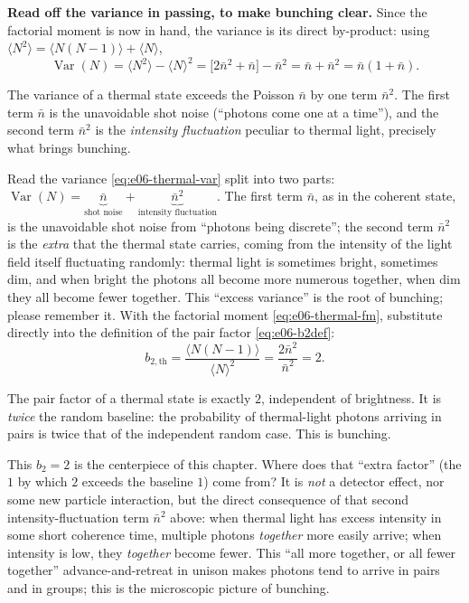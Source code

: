 \textbf{Read off the variance in passing, to make bunching clear.} Since the factorial moment is now in hand, the variance is its direct by-product: using \(\langle N^2\rangle=\langle N(N-1)\rangle+\langle N\rangle\),
\begin{equation}
  \operatorname{Var}(N)=\langle N^{2}\rangle-\langle N\rangle^{2}
  =\big[2\bar n^{2}+\bar n\big]-\bar n^{2}
  =\bar n+\bar n^{2}=\bar n(1+\bar n).
  \label{eq:e06-thermal-var}
\end{equation}
\begin{formulaexplain}
The variance of a thermal state exceeds the Poisson \(\bar n\) by one term \(\bar n^2\). The first term \(\bar n\) is the unavoidable shot noise (``photons come one at a time''), and the second term \(\bar n^2\) is the \emph{intensity fluctuation} peculiar to thermal light, precisely what brings bunching.
\end{formulaexplain}

Read the variance \eqref{eq:e06-thermal-var} split into two parts: \(\operatorname{Var}(N)=\underbrace{\bar n}_{\text{shot noise}}+\underbrace{\bar n^{2}}_{\text{intensity fluctuation}}\). The first term \(\bar n\), as in the coherent state, is the unavoidable shot noise from ``photons being discrete''; the second term \(\bar n^2\) is the \emph{extra} that the thermal state carries, coming from the intensity of the light field itself fluctuating randomly: thermal light is sometimes bright, sometimes dim, and when bright the photons all become more numerous together, when dim they all become fewer together. This ``excess variance'' is the root of bunching; please remember it. With the factorial moment \eqref{eq:e06-thermal-fm}, substitute directly into the definition of the pair factor \eqref{eq:e06-b2def}:
\begin{equation}
  b_{2,\text{th}}=\frac{\langle N(N-1)\rangle}{\langle N\rangle^{2}}
  =\frac{2\bar n^{2}}{\bar n^{2}}=2.
  \label{eq:e06-thermal-b2}
\end{equation}
\begin{formulaexplain}
The pair factor of a thermal state is exactly \(2\), independent of brightness. It is \emph{twice} the random baseline: the probability of thermal-light photons arriving in pairs is twice that of the independent random case. This is bunching.
\end{formulaexplain}

This \(b_2=2\) is the centerpiece of this chapter. Where does that ``extra factor'' (the \(1\) by which \(2\) exceeds the baseline \(1\)) come from? It is \emph{not} a detector effect, nor some new particle interaction, but the direct consequence of that second intensity-fluctuation term \(\bar n^2\) above: when thermal light has excess intensity in some short coherence time, multiple photons \emph{together} more easily arrive; when intensity is low, they \emph{together} become fewer. This ``all more together, or all fewer together'' advance-and-retreat in unison makes photons tend to arrive in pairs and in groups; this is the microscopic picture of bunching.


